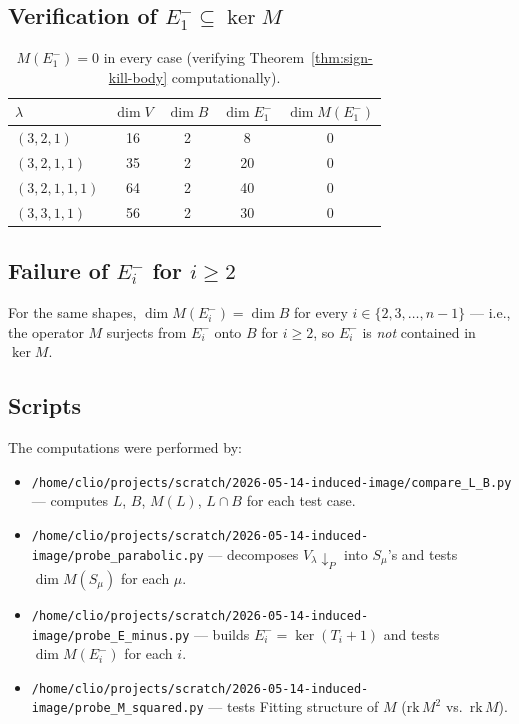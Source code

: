 \documentclass[11pt]{article}
\theoremstyle{definition}
\begin{document}
\subsection{Verification of $E_1^- \subseteq \ker M$}

\begin{table}[h]
\centering
\renewcommand{\arraystretch}{1.15}
\begin{tabular}{l|c|c|c|c}
\toprule
$\lambda$ & $\dim V$ & $\dim B$ & $\dim E_1^-$ & $\dim M(E_1^-)$ \\
\midrule
$(3, 2, 1)$        & 16 & 2 & 8  & 0 \\
$(3, 2, 1, 1)$     & 35 & 2 & 20 & 0 \\
$(3, 2, 1, 1, 1)$  & 64 & 2 & 40 & 0 \\
$(3, 3, 1, 1)$     & 56 & 2 & 30 & 0 \\
\bottomrule
\end{tabular}
\caption{$M(E_1^-) = 0$ in every case (verifying
Theorem~\ref{thm:sign-kill-body} computationally).}
\end{table}

\subsection{Failure of $E_i^-$ for $i \ge 2$}

For the same shapes, $\dim M(E_i^-) = \dim B$ for every $i \in \{2, 3,
\ldots, n-1\}$ --- i.e., the operator $M$ surjects from $E_i^-$ onto
$B$ for $i \ge 2$, so $E_i^-$ is \emph{not} contained in $\ker M$.

\subsection{Scripts}

The computations were performed by:
\begin{itemize}[leftmargin=2em,topsep=0.2em,itemsep=0.1em]
\item \texttt{/home/clio/projects/scratch/2026-05-14-induced-image/compare\_L\_B.py}
  --- computes $L$, $B$, $M(L)$, $L \cap B$ for each test case.
\item \texttt{/home/clio/projects/scratch/2026-05-14-induced-image/probe\_parabolic.py}
  --- decomposes $V_\lambda \!\downarrow_P$ into $S_\mu$'s and tests
  $\dim M(S_\mu)$ for each $\mu$.
\item \texttt{/home/clio/projects/scratch/2026-05-14-induced-image/probe\_E\_minus.py}
  --- builds $E_i^- = \ker(T_i + 1)$ and tests $\dim M(E_i^-)$ for each $i$.
\item \texttt{/home/clio/projects/scratch/2026-05-14-induced-image/probe\_M\_squared.py}
  --- tests Fitting structure of $M$ ($\mathrm{rk}\,M^2$ vs.\
  $\mathrm{rk}\,M$).
\end{itemize}
\end{document}
